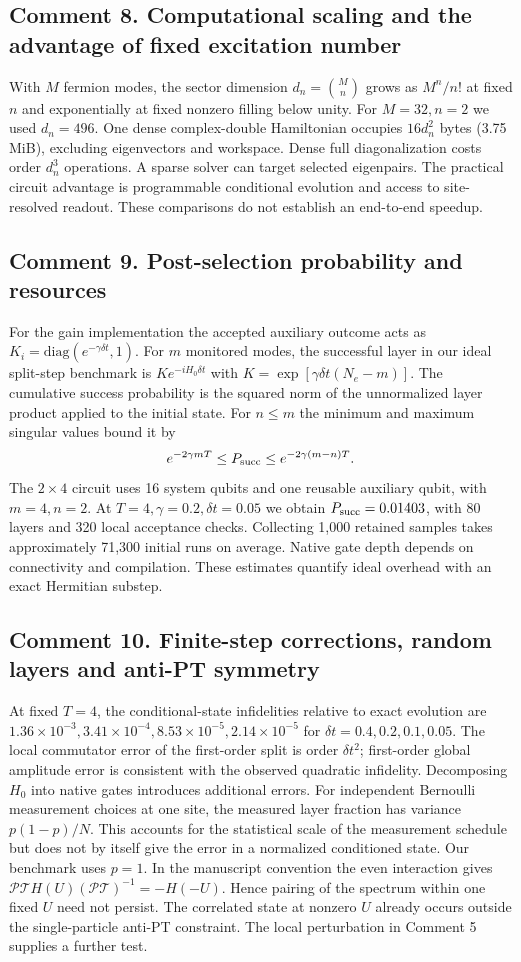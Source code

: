 \documentclass[11pt]{article}
\newcommand{\issue}[2]{\subsection*{Comment #1. #2}}
\begin{document}
\issue{8}{Computational scaling and the advantage of fixed excitation number}
With $M$ fermion modes, the sector dimension $d_n=\binom Mn$ grows as $M^n/n!$ at fixed $n$ and exponentially at fixed nonzero filling below unity. For $M=32,n=2$ we used $d_n=496$. One dense complex-double Hamiltonian occupies $16d_n^2$ bytes (3.75 MiB), excluding eigenvectors and workspace. Dense full diagonalization costs order $d_n^3$ operations. A sparse solver can target selected eigenpairs. The practical circuit advantage is programmable conditional evolution and access to site-resolved readout. These comparisons do not establish an end-to-end speedup.

\issue{9}{Post-selection probability and resources}
For the gain implementation the accepted auxiliary outcome acts as $K_i=\mathrm{diag}(e^{-\gamma\delta t},1)$. For $m$ monitored modes, the successful layer in our ideal split-step benchmark is $K e^{-iH_0\delta t}$ with $K=\exp[\gamma\delta t(N_e-m)]$. The cumulative success probability is the squared norm of the unnormalized layer product applied to the initial state. For $n\le m$ the minimum and maximum singular values bound it by
\[
 e^{-2\gamma mT}\le P_{\rm succ}\le e^{-2\gamma(m-n)T}.
\]
The $2\times4$ circuit uses 16 system qubits and one reusable auxiliary qubit, with $m=4,n=2$. At $T=4,\gamma=0.2,\delta t=0.05$ we obtain $P_{\rm succ}=0.01403$, with 80 layers and 320 local acceptance checks. Collecting 1,000 retained samples takes approximately 71,300 initial runs on average. Native gate depth depends on connectivity and compilation. These estimates quantify ideal overhead with an exact Hermitian substep.

\issue{10}{Finite-step corrections, random layers and anti-PT symmetry}
At fixed $T=4$, the conditional-state infidelities relative to exact evolution are $1.36\times10^{-3},3.41\times10^{-4},8.53\times10^{-5},2.14\times10^{-5}$ for $\delta t=0.4,0.2,0.1,0.05$. The local commutator error of the first-order split is order $\delta t^2$; first-order global amplitude error is consistent with the observed quadratic infidelity. Decomposing $H_0$ into native gates introduces additional errors. For independent Bernoulli measurement choices at one site, the measured layer fraction has variance $p(1-p)/N$. This accounts for the statistical scale of the measurement schedule but does not by itself give the error in a normalized conditioned state. Our benchmark uses $p=1$. In the manuscript convention the even interaction gives $\mathcal{PT}H(U)(\mathcal{PT})^{-1}=-H(-U)$. Hence pairing of the spectrum within one fixed $U$ need not persist. The correlated state at nonzero $U$ already occurs outside the single-particle anti-PT constraint. The local perturbation in Comment 5 supplies a further test.
\end{document}
